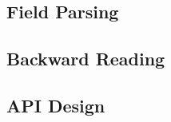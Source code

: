 \subsection{Field Parsing}%
\label{sec:FieldParsing}%


\subsection{Backward Reading}%
\label{sec:BackwardReading}%

\subsection{API Design}%
\label{sec:APIDesign}%












%
%
